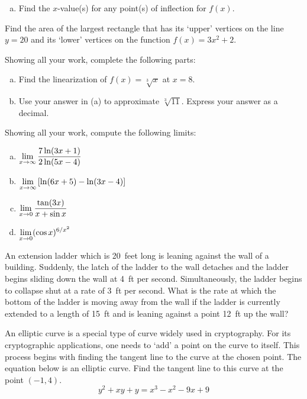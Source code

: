 \documentclass[12pt,letterpaper]{exam}
\begin{document}
\begin{questions}
\begin{enumerate}[(a)]
	\item Find the $x$-value(s) for any point(s) of inflection for $f(x)$. \vfill

	\end{enumerate}



\newpage
\question[16] Find the area of the largest rectangle that has its `upper' vertices on the line $y= 20$ and its `lower' vertices on the function $f(x)= 3x^2 + 2$. 



\newpage
\question[16] Showing all your work, complete the following parts:
	\begin{enumerate}[(a)]
	\item Find the linearization of $f(x)= \sqrt[3]{x}$ at $x= 8$. \vspace{4cm}\vfill
	\item Use your answer in (a) to approximate $\sqrt[3]{11}$. Express your answer as a decimal. \vfill
	\end{enumerate}



\newpage
\question[16] Showing all your work, compute the following limits: \par\vspace{0.3cm}
	\begin{enumerate}[(a)]
	\item $\displaystyle\lim_{x \to \infty} \dfrac{7 \ln(3x + 1)}{2 \ln(5x - 4)}$ \vfill 
	\item $\displaystyle\lim_{x \to \infty} \left[ \ln(6x + 5) - \ln(3x - 4) \right]$ \vfill
	
	\newpage
	
	\phantom{} \par
	\item $\displaystyle\lim_{x \to 0} \dfrac{\tan(3x)}{x + \sin x}$ \par\vspace{6cm}
	\item $\displaystyle\lim_{x \to 0} (\cos x)^{6/x^2}$ \vfill
	\end{enumerate}



\newpage
\question[16] An extension ladder which is 20~feet long is leaning against the wall of a building. Suddenly, the latch of the ladder to the wall detaches and the ladder begins sliding down the wall at 4~ft per second. Simultaneously, the ladder begins to collapse shut at a rate of 3~ft per second. What is the rate at which the bottom of the ladder is moving away from the wall if the ladder is currently extended to a length of 15~ft and is leaning against a point 12~ft up the wall?



\newpage
\question[16] An elliptic curve is a special type of curve widely used in cryptography. For its cryptographic applications, one needs to `add' a point on the curve to itself. This process begins with finding the tangent line to the curve at the chosen point. The equation below is an elliptic curve. Find the tangent line to this curve at the point $(-1, 4)$.
	\[
	y^2 + xy + y= x^3 - x^2 - 9x + 9
	\]

\end{questions}
\end{document}
